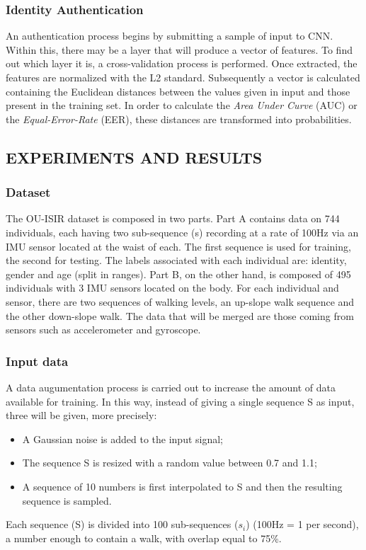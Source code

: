 \subsubsection{Identity Authentication}
An authentication process begins by submitting a sample of input to CNN. 
Within this, there may be a layer that will produce a vector of features. 
To find out which layer it is, a cross-validation process is performed. Once 
extracted, the features are normalized with the L2 standard. Subsequently 
a vector is calculated containing the Euclidean distances between the values 
given in input and those present in the training set. In order to calculate the 
\emph{Area Under Curve} (AUC) or the \emph{Equal-Error-Rate} (EER), these distances 
are transformed into probabilities.

\subsection{EXPERIMENTS AND RESULTS}
\subsubsection{Dataset}
The OU-ISIR dataset is composed in two parts. Part A contains data on 744 
individuals, each having two sub-sequence (s) recording at a rate of 100Hz 
via an IMU sensor located at the waist of each. The first sequence is used for 
training, the second for testing. The labels associated with each individual 
are: identity, gender and age (split in ranges). Part B, on the other hand, 
is composed of 495 individuals with 3 IMU sensors located on the body. For 
each individual and sensor, there are two sequences of walking levels, an up-slope 
walk sequence and the other down-slope walk. The data that will be 
merged are those coming from sensors such as accelerometer and gyroscope.

\subsubsection{Input data}
A data augumentation process is carried out to increase the amount of data 
available for training. In this way, instead of giving a single sequence S 
as input, three will be given, more precisely:
\begin{itemize}
    \item A Gaussian noise is added to the input signal;
    \item The sequence S is resized with a random value between 0.7 and 1.1;
    \item A sequence of 10 numbers is first interpolated to S and then the resulting sequence is sampled.
\end{itemize}
Each sequence (S) is divided into 100 sub-sequences ($ s_i $) (100Hz = 1 per 
second), a number enough to contain a walk, with overlap equal to 75\%.

